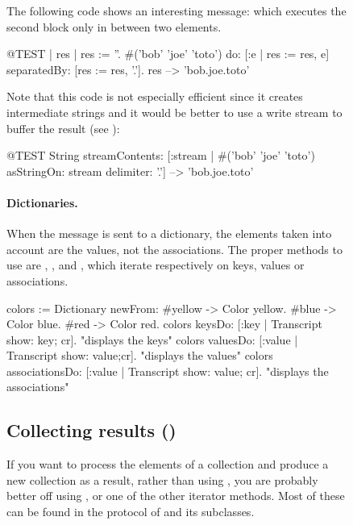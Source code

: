 \documentclass[a4paper,10pt,twoside]{book}
\begin{document}
\begin{figure}
\begin{center}
The following code shows an interesting message:  which 
executes the second block only in between two elements.
\begin{code}{@TEST | res | }
res := ''.
#('bob' 'joe' 'toto') do: [:e | res := res, e] separatedBy: [res := res, '.'].
res --> 'bob.joe.toto'
\end{code}
\noindent
Note that this code is not especially efficient since it creates intermediate strings and it would be better to use a write stream to buffer the result (see ):
\begin{code}{@TEST}
String streamContents: [:stream | #('bob' 'joe' 'toto') asStringOn: stream delimiter: '.'] --> 'bob.joe.toto'
\end{code}



\paragraph{Dictionaries.}
When the message  is sent to a dictionary, the elements taken into account are the values, not the associations. The proper methods to use are , , and , which iterate respectively on keys, values or associations.

\begin{code}{}
colors := Dictionary newFrom: {#yellow -> Color yellow. #blue -> Color blue. #red -> Color red}.
colors keysDo: [:key | Transcript show: key; cr].                    "displays the keys"
colors valuesDo: [:value | Transcript show: value;cr].            "displays the values"
colors associationsDo: [:value | Transcript show: value; cr].  "displays the associations"
\end{code}

\subsection{Collecting results ()}
If you want to process the elements of a collection and produce a new collection as a result, rather than using , you are probably better off using , or one of the other iterator methods.
Most of these can be found in the  protocol of  and its subclasses.


\end{center}
\end{figure}
\end{document}
